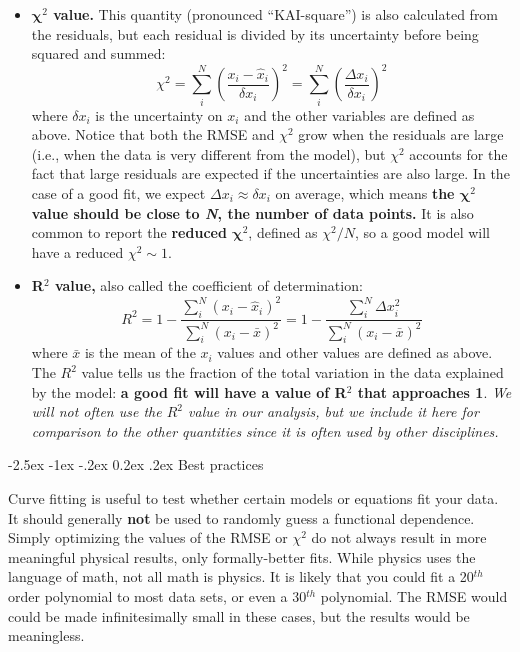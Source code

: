 \documentclass[11pt]{article}
\makeatletter
\renewcommand\subsection{\@startsection {subsection}{2}{\z@}%
     {-2.5ex \@plus -1ex \@minus -.2ex}%
     {0.2ex \@plus.2ex}%
    {\bfseries\large}}
\makeatother
\begin{document}
\begin{itemize}
\item {\bf $\boldsymbol{\chi}^2$ value.} This quantity (pronounced ``KAI-square'') is also 
calculated from the residuals, but each residual is divided by its uncertainty before being 
squared and summed:
\begin{equation}
  \chi^2 = \sum_i^N \left(\frac{x_i-\hat{x}_i}{\delta x_i}\right)^2= \sum_i^N \left(\frac{\Delta x_i}{\delta x_i}\right)^2
\end{equation}
where $\delta x_i$ is the uncertainty on $x_i$ and the other variables are defined as above. Notice that 
both the RMSE and $\chi^2$ grow when the residuals are large (i.e., when the data is very different from the model), but $\chi^2$ accounts for the fact that large residuals are expected if the uncertainties are also large. In the case of a good fit, we expect $\Delta x_i\approx\delta x_i$ on average, which means {\bf the $\boldsymbol{\chi}^2$ value should be close to \textbf{\textit{N}}, the 
number of data points.} It is also common to report the \textbf{reduced $\boldsymbol{\chi}^2$}, defined as $\chi^2/N$, so a good model will have a reduced $\chi^2\sim1$. %

\item {\bf R$^2$ value,} also called the coefficient of determination:
\begin{equation}
  R^2 = 1-\frac{\sum_i^N (x_i-\hat{x}_i)^2}{\sum_i^N (x_i-\bar{x})^2} = 1-\frac{\sum_i^N \Delta x_i^2}{\sum_i^N (x_i-\bar{x})^2}
\end{equation}
where $\bar{x}$ is the mean of the $x_i$ values and other values are defined as above. 
The $R^2$ value tells us the fraction of the total variation in the data explained by
the model: {\bf a good fit will have a value of R$^2$ that approaches 1}. \textit{We will not often use the $R^2$
value in our analysis, but we include it here for comparison to the other quantities since it is often used by other disciplines.}
\end{itemize}

\subsection{Best practices}

Curve fitting is useful to test whether certain models or equations fit your
data. It should generally {\bf not} be used to randomly guess a functional dependence.
Simply optimizing the values of the RMSE or $\chi^2$ do not always result in more
meaningful physical results, only formally-better fits. While physics uses the language
of math, not all math is physics. It is likely that you could fit a 20$^{th}$
order polynomial to most data sets, or even a 30$^{th}$ polynomial. The RMSE
would could be made infinitesimally small in these cases, but the results would 
be meaningless.
\end{document}
